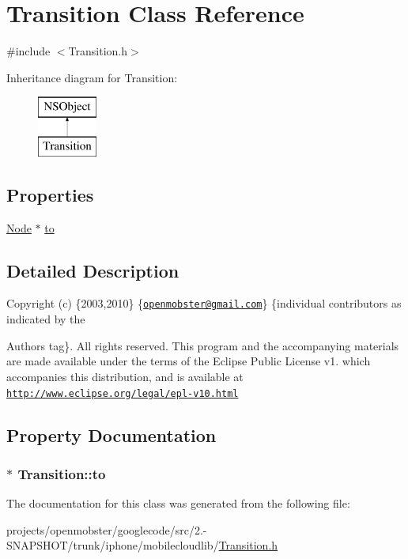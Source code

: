 \hypertarget{interface_transition}{
\section{\-Transition \-Class \-Reference}
\label{interface_transition}
}


{\ttfamily \#include $<$\-Transition.\-h$>$}

\-Inheritance diagram for \-Transition\-:\begin{figure}[H]
\begin{center}
\leavevmode
\includegraphics[height=2.000000cm]{interface_transition}
\end{center}
\end{figure}
\subsection*{\-Properties}
\begin{DoxyCompactItemize}
\item 
\hyperlink{interface_node}{\-Node} $\ast$ \hyperlink{interface_transition_a881f5101098e52ace66bb5551629c635}{to}
\end{DoxyCompactItemize}


\subsection{\-Detailed \-Description}
\-Copyright (c) \{2003,2010\} \{\href{mailto:openmobster@gmail.com}{\tt openmobster@gmail.\-com}\} \{individual contributors as indicated by the \begin{DoxyAuthor}{\-Authors}
tag\}. \-All rights reserved. \-This program and the accompanying materials are made available under the terms of the \-Eclipse \-Public \-License v1. which accompanies this distribution, and is available at \href{http://www.eclipse.org/legal/epl-v10.html}{\tt http\-://www.\-eclipse.\-org/legal/epl-\/v10.\-html} 
\end{DoxyAuthor}


\subsection{\-Property \-Documentation}
\hypertarget{interface_transition_a881f5101098e52ace66bb5551629c635}{
\subsubsection[{to}]{ $\ast$ \-Transition\-::to}}
\label{interface_transition_a881f5101098e52ace66bb5551629c635}


\-The documentation for this class was generated from the following file\-:\begin{DoxyCompactItemize}
\item 
projects/openmobster/googlecode/src/2.-\/\-S\-N\-A\-P\-S\-H\-O\-T/trunk/iphone/mobilecloudlib/\hyperlink{_transition_8h}{\-Transition.\-h}\end{DoxyCompactItemize}

